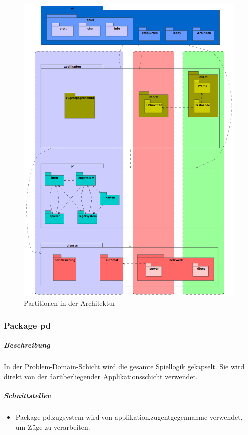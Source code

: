 \documentclass[12pt,halfparskip]{scrartcl}
\begin{document}
\begin{figure}
	\centering
	\includegraphics[width=\textwidth]{architektur_partitions}
	\caption{Partitionen in der Architektur}
	\label{fig:architektur_partitions}
\end{figure}

\clearpage

\subsubsection{Package pd} %
\label{ssub:package_pd}
\subparagraph{Beschreibung}
In der Problem-Domain-Schicht wird die gesamte Spiellogik gekapselt. Sie wird direkt von der darüberliegenden Applikationsschicht verwendet.

\subparagraph{Schnittstellen} %
\label{ssub:schnittstellen}
\begin{itemize}
	\item Package pd.zugsystem wird von applikation.zugentgegennahme verwendet, um Züge zu verarbeiten.
\end{itemize}
\end{document}

